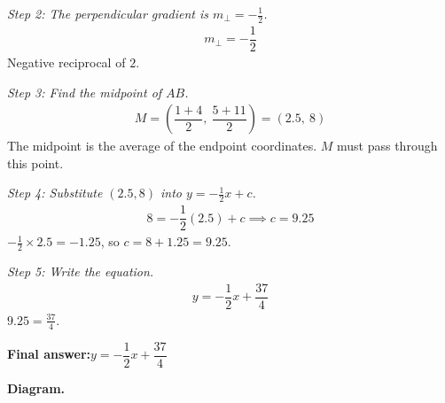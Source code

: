 \documentclass[11pt]{article}
\begin{document}
\textit{Step 2: The perpendicular gradient is \( m_\perp = -\frac{1}{2} \).}
\[\begin{gathered}
m_\perp = -\dfrac{1}{2}
\end{gathered}\]
Negative reciprocal of \( 2 \).

\textit{Step 3: Find the midpoint of \( AB \).}
\[\begin{gathered}
M = \left(\dfrac{1+4}{2},\ \dfrac{5+11}{2}\right) = (2.5,\ 8)
\end{gathered}\]
The midpoint is the average of the endpoint coordinates. \( M \) must pass through this point.

\textit{Step 4: Substitute \( (2.5, 8) \) into \( y = -\frac{1}{2}x + c \).}
\[\begin{gathered}
8 = -\dfrac{1}{2}(2.5) + c \implies c = 9.25
\end{gathered}\]
\( -\tfrac{1}{2} \times 2.5 = -1.25 \), so \( c = 8 + 1.25 = 9.25 \).

\textit{Step 5: Write the equation.}
\[\begin{gathered}
y = -\dfrac{1}{2}x + \dfrac{37}{4}
\end{gathered}\]
\( 9.25 = \frac{37}{4} \).

\begin{answerbox}
\textbf{Final answer:}\quad \(\displaystyle y = -\dfrac{1}{2}x + \dfrac{37}{4}\)
\end{answerbox}
\textbf{Diagram.}
\end{document}
